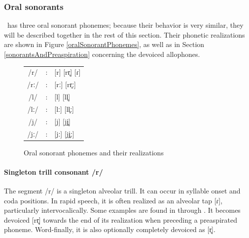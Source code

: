 \subsubsection{Oral sonorants}\label{oralSonorants}%
\PS\ has three oral sonorant phonemes; %
because their behavior is very similar, they will be described together in the rest of this section. 
Their phonetic realizations are shown in Figure \vref{oralSonorantPhonemes}, as well as in Section \ref{sonorantsAndPreaspiration} concerning the devoiced allophones. 
\begin{figure}\centering
\begin{tabular}{c c l}
/r/ &:& [r] [rr̥] [ɾ]\\ %
/rː/ &:& [rː] [rr̥ː] \\ %
/l/ &:& [l] [ll̥]\\ %
/lː/ &:& [lː] [ll̥ː]\\ %
/j/ &:& [j] [jj̥] \\ %
/jː/ &:& [jː] [jj̥ː] \\ %
\end{tabular}
\caption{Oral sonorant phonemes and their realizations}\label{oralSonorantPhonemes}%
\end{figure}


\paragraph{Singleton trill consonant /r/}
The segment /r/ is a singleton alveolar trill. It can occur in syllable onset and coda positions. %
In rapid speech, it is often realized as an alveolar tap [ɾ], particularly intervocalically. Some examples are found in  through . It becomes devoiced [rr̥] towards the end of its realization when preceding a preaspirated phoneme. 
Word-finally, it is also optionally completely devoiced as [r̥].%

